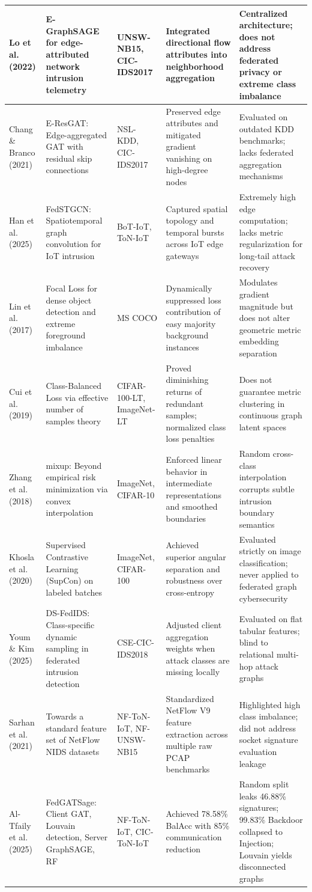 \documentclass[12pt,a4paper]{report}
\begin{document}
{\begin{longtable}{|p{2.3cm}|p{2.7cm}|p{1.8cm}|p{4.2cm}|p{3.7cm}|}
\hline
Lo et al. (2022) & E-GraphSAGE for edge-attributed network intrusion telemetry & UNSW-NB15, CIC-IDS2017 & Integrated directional flow attributes into neighborhood aggregation & Centralized architecture; does not address federated privacy or extreme class imbalance \\
\hline
Chang \& Branco (2021) & E-ResGAT: Edge-aggregated GAT with residual skip connections & NSL-KDD, CIC-IDS2017 & Preserved edge attributes and mitigated gradient vanishing on high-degree nodes & Evaluated on outdated KDD benchmarks; lacks federated aggregation mechanisms \\
\hline
Han et al. (2025) & FedSTGCN: Spatiotemporal graph convolution for IoT intrusion & BoT-IoT, ToN-IoT & Captured spatial topology and temporal bursts across IoT edge gateways & Extremely high edge computation; lacks metric regularization for long-tail attack recovery \\
\hline
Lin et al. (2017) & Focal Loss for dense object detection and extreme foreground imbalance & MS COCO & Dynamically suppressed loss contribution of easy majority background instances & Modulates gradient magnitude but does not alter geometric metric embedding separation \\
\hline
Cui et al. (2019) & Class-Balanced Loss via effective number of samples theory & CIFAR-100-LT, ImageNet-LT & Proved diminishing returns of redundant samples; normalized class loss penalties & Does not guarantee metric clustering in continuous graph latent spaces \\
\hline
Zhang et al. (2018) & mixup: Beyond empirical risk minimization via convex interpolation & ImageNet, CIFAR-10 & Enforced linear behavior in intermediate representations and smoothed boundaries & Random cross-class interpolation corrupts subtle intrusion boundary semantics \\
\hline
Khosla et al. (2020) & Supervised Contrastive Learning (SupCon) on labeled batches & ImageNet, CIFAR-100 & Achieved superior angular separation and robustness over cross-entropy & Evaluated strictly on image classification; never applied to federated graph cybersecurity \\
\hline
Youm \& Kim (2025) & DS-FedIDS: Class-specific dynamic sampling in federated intrusion detection & CSE-CIC-IDS2018 & Adjusted client aggregation weights when attack classes are missing locally & Evaluated on flat tabular features; blind to relational multi-hop attack graphs \\
\hline
Sarhan et al. (2021) & Towards a standard feature set of NetFlow NIDS datasets & NF-ToN-IoT, NF-UNSW-NB15 & Standardized NetFlow V9 feature extraction across multiple raw PCAP benchmarks & Highlighted high class imbalance; did not address socket signature evaluation leakage \\
\hline
Al-Tfaily et al. (2025) & FedGATSage: Client GAT, Louvain detection, Server GraphSAGE, RF & NF-ToN-IoT, CIC-ToN-IoT & Achieved 78.58\% BalAcc with 85\% communication reduction & Random split leaks 46.88\% signatures; 99.83\% Backdoor collapsed to Injection; Louvain yields disconnected graphs \\
\hline
\end{longtable}}
\end{document}

